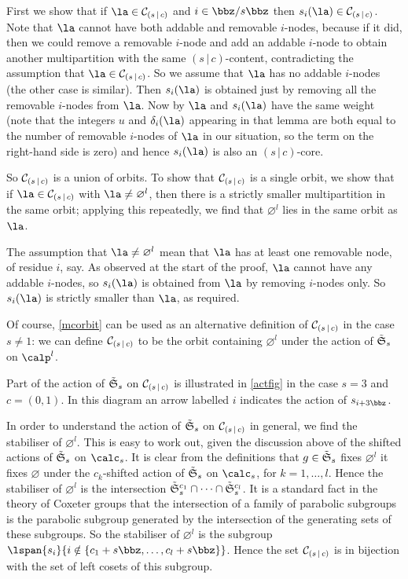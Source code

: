 \documentclass[a4paper, 11pt, twoside]{article}
\begin{document}
\begin{pf}
First we show that if $\la\in\mc sc$ and $i\in\zsz$ then $s_i(\la)\in\mc sc$. Note that $\la$ cannot have both addable and removable $i$-nodes, because if it did, then we could remove a removable $i$-node and add an addable $i$-node to obtain another multipartition with the same $(s\,|\,c)$-content, contradicting the assumption that $\la\in\mc sc$. So we assume that $\la$ has no addable $i$-nodes (the other case is similar). Then $s_i(\la)$ is obtained just by removing all the removable $i$-nodes from $\la$. Now by \cite[Lemma 3.6]{mfwt} $\la$ and $s_i(\la)$ have the same weight (note that the integers $u$ and $\delta_i(\la)$ appearing in that lemma are both equal to the number of removable $i$-nodes of $\la$ in our situation, so the term on the right-hand side is zero) and hence $s_i(\la)$ is also an $(s\,|\,c)$-core.

So $\mathcal{C}_{(s\,|\,c)}$ is a union of orbits. To show that $\mathcal{C}_{(s\,|\,c)}$ is a single orbit, we show that if $\la\in\mc sc$ with $\la\neq\varnothing^l$, then there is a strictly smaller multipartition in the same orbit; applying this repeatedly, we find that $\varnothing^l$ lies in the same orbit as $\la$.

The assumption that $\la\neq\varnothing^l$ mean that $\la$ has at least one removable node, of residue $i$, say. As observed at the start of the proof, $\la$ cannot have any addable $i$-nodes, so $s_i(\la)$ is obtained from $\la$ by removing $i$-nodes only. So $s_i(\la)$ is strictly smaller than $\la$, as required.
\end{pf}

Of course, \cref{mcorbit} can be used as an alternative definition of $\mathcal{C}_{(s\,|\,c)}$ in the case $s\neq1$: we can define $\mathcal{C}_{(s\,|\,c)}$ to be the orbit containing $\varnothing^l$ under the action of $\tilde{\mathfrak S}_ s$ on $\calp^l$.

Part of the action of $\tilde{\mathfrak S}_ s$ on $\mathcal{C}_{(s\,|\,c)}$ is illustrated in \cref{actfig} in the case $s=3$ and $c=(0,1)$. In this diagram an arrow labelled $i$ indicates the action of $s_{i+3\bbz}$.

In order to understand the action of $\tilde{\mathfrak S}_ s$ on $\mathcal{C}_{(s\,|\,c)}$ in general, we find the stabiliser of $\varnothing^l$. This is easy to work out, given the discussion above of the shifted actions of $\tilde{\mathfrak S}_ s$ on $\cores s$. It is clear from the definitions that $g\in\tilde{\mathfrak S}_ s$ fixes $\varnothing^l$ \iff it fixes $\varnothing$ under the $c_k$-shifted action of $\tilde{\mathfrak S}_ s$ on $\cores s$, for $k=1,\dots,l$. Hence the stabiliser of $\varnothing^l$ is the intersection $\tilde{\mathfrak S}_ s^{c_1}\cap\dots\cap\tilde{\mathfrak S}_ s^{c_l}$. It is a standard fact in the theory of Coxeter groups that the intersection of a family of parabolic subgroups is the parabolic subgroup generated by the intersection of the generating sets of these subgroups. So the stabiliser of $\varnothing^l$ is the subgroup $\lspan{s_i}{i\notin\{c_1+s\bbz,\dots,c_l+s\bbz\}}$. Hence the set $\mathcal{C}_{(s\,|\,c)}$ is in bijection with the set of left cosets of this subgroup.
\end{document}
